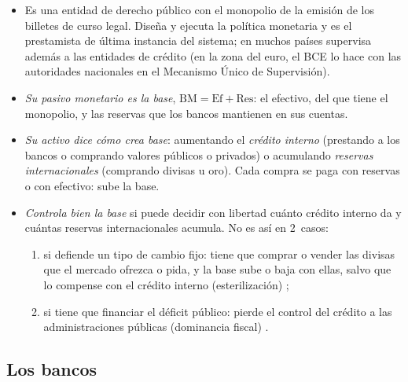 \documentclass[11pt]{article}
\begin{document}
\begin{itemize}
\item Es una entidad de derecho público con el monopolio de la emisión de los billetes de curso legal. Diseña y ejecuta la política monetaria y es el prestamista de última instancia del sistema; en muchos países supervisa además a las entidades de crédito (en la zona del euro, el BCE lo hace con las autoridades nacionales en el Mecanismo Único de Supervisión).
\item \emph{Su pasivo monetario es la base}, $\mathrm{BM}=\mathrm{Ef}+\mathrm{Res}$: el efectivo, del que tiene el monopolio, y las reservas que los bancos mantienen en sus cuentas.
\item \emph{Su activo dice cómo crea base}: aumentando el \emph{crédito interno} (prestando a los bancos o comprando valores públicos o privados) o acumulando \emph{reservas internacionales} (comprando divisas u oro). Cada compra se paga con reservas o con efectivo: sube la base.
\item \emph{Controla bien la base} si puede decidir con libertad cuánto crédito interno da y cuántas reservas internacionales acumula. No es así en 2~casos:
  \begin{enumerate}
  \item si defiende un tipo de cambio fijo: tiene que comprar o vender las divisas que el mercado ofrezca o pida, y la base sube o baja con ellas, salvo que lo compense con el crédito interno (esterilización) ;
  \item si tiene que financiar el déficit público: pierde el control del crédito a las administraciones públicas (dominancia fiscal) .
  \end{enumerate}
\end{itemize}

\subsection{Los bancos}
\end{document}
